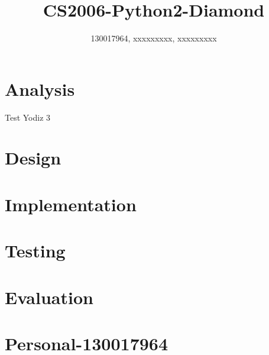 \documentclass{article}
\title{CS2006-Python2-Diamond}
\author{130017964, xxxxxxxxx, xxxxxxxxx}
\begin{document}
\maketitle

\section{Analysis}
Test Yodiz 3
\section{Design}
\section{Implementation}
\section{Testing}
\section{Evaluation}
\section{Personal-130017964}
\end{document}
